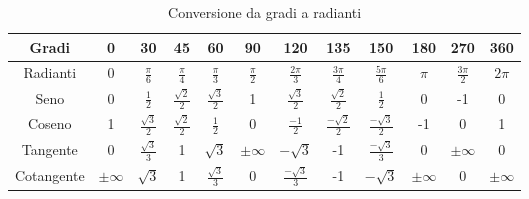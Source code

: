 \documentclass{book}
\begin{document}
\begin{table}[H]
    \centering
    \renewcommand{\arraystretch}{2.5}
    \begin{tabular}{|c|c|c|c|c|c|c|c|c|c|c|c|}
        \hline
        \cellcolor{lightblue}Gradi      & 0           & 30                                & 45                                & 60                                & 90                           & 120                                & 135                                & 150                                & 180         & 270                           & 360         \\ \hline
        \cellcolor{lightblue}Radianti   & 0           & $\displaystyle\frac{\pi}{6}$      & $\displaystyle\frac{\pi}{4}$      & $\displaystyle\frac{\pi}{3}$      & $\displaystyle\frac{\pi}{2}$ & $\displaystyle\frac{2\pi}{3}$      & $\displaystyle\frac{3\pi}{4}$      & $\displaystyle\frac{5\pi}{6}$      & $\pi$       & $\displaystyle\frac{3\pi}{2}$ & $2\pi$      \\ \hline
        \cellcolor{lightblue}Seno       & 0           & $\displaystyle\frac{1}{2}$        & $\displaystyle\frac{\sqrt{2}}{2}$ & $\displaystyle\frac{\sqrt{3}}{2}$ & 1                            & $\displaystyle\frac{\sqrt{3}}{2}$  & $\displaystyle\frac{\sqrt{2}}{2}$  & $\displaystyle\frac{1}{2}$         & 0           & -1                            & 0           \\ \hline
        \cellcolor{lightblue}Coseno     & 1           & $\displaystyle\frac{\sqrt{3}}{2}$ & $\displaystyle\frac{\sqrt{2}}{2}$ & $\displaystyle\frac{1}{2}$        & 0                            & $\displaystyle\frac{-1}{2}$        & $\displaystyle\frac{-\sqrt{2}}{2}$ & $\displaystyle\frac{-\sqrt{3}}{2}$ & -1          & 0                             & 1           \\ \hline
        \cellcolor{lightblue}Tangente   & 0           & $\displaystyle\frac{\sqrt{3}}{3}$ & 1                                 & $\sqrt{3}$                        & $\pm\infty$                  & $-\sqrt{3}$                        & -1                                 & $\displaystyle\frac{-\sqrt{3}}{3}$ & 0           & $\pm\infty$                   & 0           \\ \hline
        \cellcolor{lightblue}Cotangente & $\pm\infty$ & $\sqrt{3}$                        & 1                                 & $\displaystyle\frac{\sqrt{3}}{3}$ & 0                            & $\displaystyle\frac{-\sqrt{3}}{3}$ & -1                                 & $-\sqrt{3}$                        & $\pm\infty$ & 0                             & $\pm\infty$ \\ \hline
    \end{tabular}
    \caption{Conversione da gradi a radianti}
    \label{tab:gradi-radianti}
\end{table}
\end{document}
